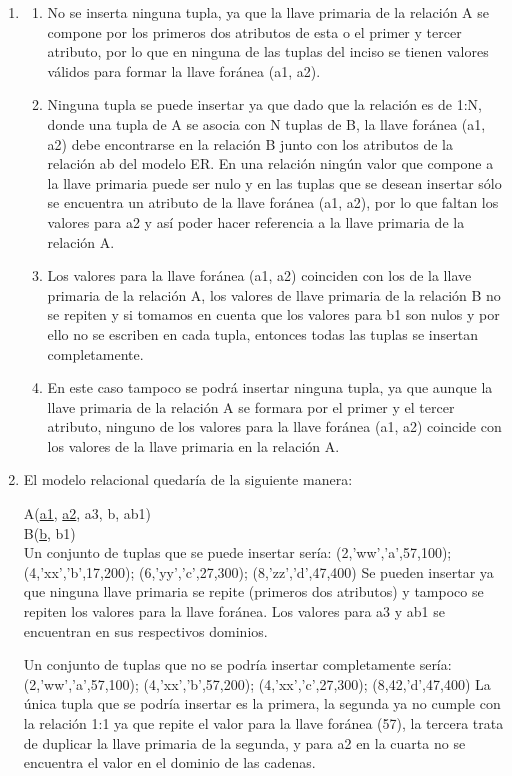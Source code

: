 \documentclass{exam}
\begin{document}
\begin{questions}
\begin{enumerate}[label=\alph*.]
		\item 
		\begin{enumerate}[label=(\roman*)]
			\item No se inserta ninguna tupla, ya que la llave primaria de la relación A se compone por los primeros dos atributos de esta o el primer y tercer atributo,
por lo que en ninguna de las tuplas del inciso se tienen valores válidos para formar la llave foránea (a1, a2).
			\item Ninguna tupla se puede insertar ya que dado que la relación es de 1:N, donde una tupla de A se asocia con N tuplas de B, la llave foránea (a1, a2) debe
encontrarse en la relación B junto con los atributos de la relación ab del modelo ER. En una relación ningún valor que compone a la llave primaria puede
ser nulo y en las tuplas que se desean insertar sólo se encuentra un atributo de la llave foránea (a1, a2), por lo que faltan los valores para a2 y así
poder hacer referencia a la llave primaria de la relación A.
			\item Los valores para la llave foránea (a1, a2) coinciden con los de la llave primaria de la relación A, los valores de llave primaria de la relación B no se
repiten y si tomamos en cuenta que los valores para b1 son nulos y por ello no se escriben en cada tupla, entonces todas las tuplas se insertan
completamente.
			\item En este caso tampoco se podrá insertar ninguna tupla, ya que aunque la llave primaria de la relación A se formara por el primer y el tercer atributo, ninguno
de los valores para la llave foránea (a1, a2) coincide con los valores de la llave primaria en la relación A.
		\end{enumerate}
			
		\item El modelo relacional quedaría de la siguiente manera:
		
A(\underline{a1}, \underline{a2}, a3, b, ab1)\\
B(\underline{b}, b1)\\

Un conjunto de tuplas que se puede insertar sería:
(2,'ww','a',57,100); (4,'xx','b',17,200); (6,'yy','c',27,300); (8,'zz','d',47,400)
Se pueden insertar ya que ninguna llave primaria se repite (primeros dos atributos) y tampoco se repiten los valores para la llave foránea. Los valores para
a3 y ab1 se encuentran en sus respectivos dominios.

Un conjunto de tuplas que no se podría insertar completamente sería:
(2,'ww','a',57,100); (4,'xx','b',57,200); (4,'xx','c',27,300); (8,42,'d',47,400)
La única tupla que se podría insertar es la primera, la segunda ya no cumple con la relación 1:1 ya que repite el valor para la llave foránea (57), la tercera
trata de duplicar la llave primaria de la segunda, y para a2 en la cuarta no se encuentra el valor en el dominio de las cadenas.
	

\end{enumerate}
\end{questions}
\end{document}
